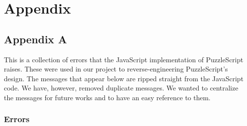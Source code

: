 \chapter{Appendix}
\label{ch:appendix}

\section{Appendix A}
This is a collection of errors that the JavaScript implementation of PuzzleScript raises. These were used in our project to reverse-engineering PuzzleScript's design. The messages that appear below are ripped straight from the JavaScript code. We have, however, removed duplicate messages. We wanted to centralize the messages for future works and to have an easy reference to them.

\subsection{Errors}
